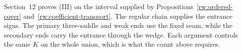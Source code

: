 Section~12 proves \textup{(III)} on the interval supplied by
Propositions~\ref{rw:ordered-cover} and~\ref{rw:coefficient-transport}.
The regular chain supplies the entrance signs.  The primary
three-saddle and weak ends use the fixed seam, while the secondary
ends carry the entrance through the wedge.  Each argument controls
the same $K$ on the whole union, which is what the count above requires.

